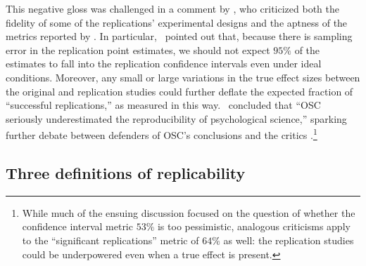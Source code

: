 \documentclass[aoas, preprint]{imsart}
\theoremstyle{definition}
\theoremstyle{custom}
\begin{document}
  This negative gloss was challenged in a comment by \citet{Gilbert:2016he}, who criticized both the fidelity of some of the replications' experimental designs and the aptness of the metrics reported by \citet{OpenScienceCollaboration:2015cn}. In particular, \citeauthor{Gilbert:2016he}\ pointed out that, because there is sampling error in the replication point estimates, we should not expect $95\%$ of the estimates to fall into the replication confidence intervals even under ideal conditions. Moreover, any small or large variations in the true effect sizes between the original and replication studies could further deflate the expected fraction of ``successful replications,'' as measured in this way. \citeauthor{Gilbert:2016he}\ concluded that ``OSC seriously underestimated the reproducibility of psychological science,'' sparking further debate between defenders of OSC's conclusions \citep{Anderson:2016gs,Srivastava:2016,Nosek:2016} and the critics \citep{Gilbert:2016uv,Gilbert:2016th}.\footnote{While much of the ensuing discussion focused on the question of whether the confidence interval metric $53\%$ is too pessimistic, analogous criticisms apply to the ``significant replications'' metric of $64\%$ as well: the replication studies could be underpowered even when a true effect is present.}

\subsection{Three definitions of replicability}
\end{document}
